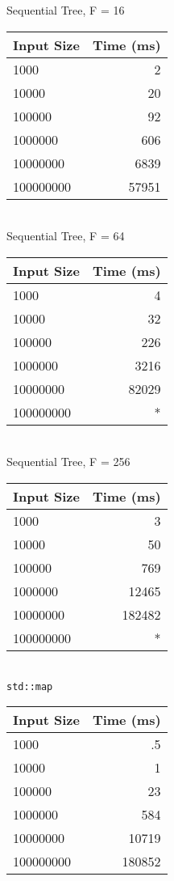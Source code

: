 \documentclass{sig-alternate}
\begin{document}
Sequential Tree, F = 16\\
\begin{tabular}{| l | r |}
  \hline
  Input Size & Time (ms)\\  \hline
  1000			&	2	\\
  10000			&	20	\\
  100000		&	92	\\
  1000000		&	606	\\
  10000000		&	6839	\\
  100000000		&	57951	\\
  \hline
\end{tabular} \\

Sequential Tree, F = 64\\
\begin{tabular}{| l | r |}
  \hline
  Input Size & Time (ms)\\  \hline
  1000			&	4	\\
  10000			&	32	\\
  100000		&	226	\\
  1000000		&	3216	\\
  10000000		&	82029	\\
  100000000		&	* \\
  \hline
\end{tabular} \\

Sequential Tree, F = 256\\
\begin{tabular}{| l | r |}
  \hline
  Input Size & Time (ms)\\  \hline
  1000			&	3	\\
  10000			&	50	\\
  100000		&	769	\\
  1000000		&	12465	\\
  10000000		&	182482	\\
  100000000		&	*	\\
  \hline
\end{tabular}\\

\texttt{std::map}\\
\begin{tabular}{| l | r |}
  \hline
  Input Size & Time (ms)\\  \hline
  1000			&	.5	\\
  10000			&	1	\\
  100000		&	23	\\
  1000000		&	584	\\
  10000000		&	10719	\\
  100000000		&	180852	\\
  \hline
\end{tabular}\\
\end{document}
